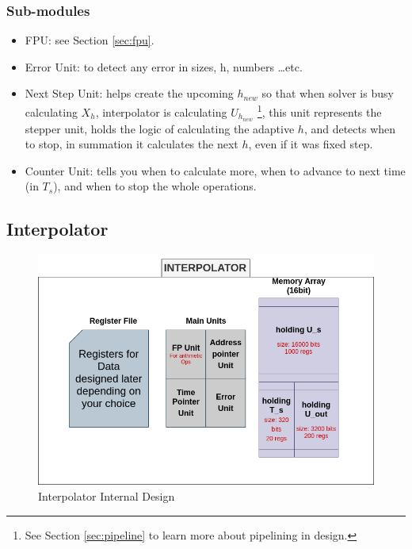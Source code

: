 \documentclass[12pt]{report}
\begin{document}
\subsubsection{Sub-modules}
\begin{itemize}
    \item {FPU}: see Section \ref{sec:fpu}.
    \item {Error Unit}: to detect any error in sizes, h, numbers \dots etc.
    \item {Next Step Unit}: helps create the upcoming $h_{new}$ so that when solver is busy calculating $X_h$, interpolator is calculating $U_{h_{new}}$ \footnote{See Section \ref{sec:pipeline} to learn more about pipelining in design.}, this unit represents the stepper unit, holds the logic of calculating the adaptive $h$, and detects when to stop, in summation it calculates the next $h$, even if it was fixed step.
    \item {Counter Unit}: tells you when to calculate more, when to advance to next time (in $T_s$), and when to stop the whole operations.
\end{itemize}

\subsection{Interpolator}

\begin{figure}[hp]
    \centering
    \includegraphics[width=\textwidth]{interpolator}
    \caption{Interpolator Internal Design}
    \label{fig:interpolator}
\end{figure}
\end{document}
